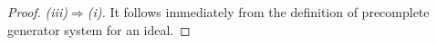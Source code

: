 \documentclass[10pt,a4paper]{amsart}
\begin{document}
\begin{proof}















\noindent\emph{(iii)$\Rightarrow$(i).} It follows immediately from the definition of precomplete generator system for an ideal.
\end{proof}
\end{document}
